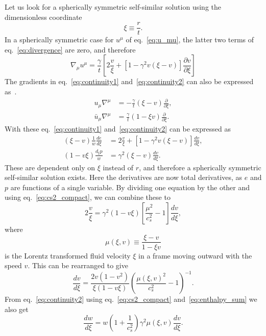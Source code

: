 Let us look for a spherically symmetric self-similar solution using the dimensionless coordinate
\begin{equation}
\xi \equiv \frac{r}{t}.
\label{eq:xi}
\end{equation}
In a spherically symmetric case for $u^\mu$ of eq.~\eqref{eq:u_mu},
the latter two terms of eq.~\eqref{eq:divergence} are zero, and therefore
\begin{equation}
\nabla_\mu u^\mu = \frac{\gamma}{t} \left[ 2\frac{v}{\xi} + \left[1 - \gamma^2 v (\xi - v) \right] \frac{\partial v}{\partial \xi} \right]
\end{equation}
The gradients in eq.~\eqref{eq:continuity1} and~\eqref{eq:continuity2} can also be expressed as~\cite[eq. 25]{espinosa_energy_2010}.
\begin{align}
u_\mu \nabla^\mu &= - \frac{\gamma}{t} (\xi - v) \frac{\partial}{\partial \xi}, \\
\bar{u}_\mu \nabla^\mu &= \frac{\gamma}{t} (1 - \xi v) \frac{\partial}{\partial \xi}.
\end{align}
With these eq.~\eqref{eq:continuity1} and~\eqref{eq:continuity2} can be expressed as
\begin{align}
(\xi - v) \frac{1}{w} \frac{de}{d\xi} &= 2 \frac{v}{\xi} + \left[ 1 - \gamma^2 v (\xi - v) \right] \frac{dv}{d\xi}, \\
(1 - v\xi) \frac{d_\xi p}{w} &= \gamma^2 (\xi - v) \frac{dv}{d\xi}.
\end{align}
These are dependent only on $\xi$ instead of $r$,
and therefore a spherically symmetric self-similar solution exists.
Here the derivatives are now total derivatives, as $e$ and $p$ are functions of a single variable.
By dividing one equation by the other and using eq.~\eqref{eq:cs2_compact}, we can combine these to
\begin{equation}
2 \frac{v}{\xi} = \gamma^2 (1 - v\xi) \left[ \frac{\mu^2}{c_s^2} - 1 \right] \frac{dv}{d\xi},
\label{eq:continuity_combined}
\end{equation}
where
\begin{equation}
\mu(\xi,v) \equiv \frac{\xi - v}{1 - \xi v}
\label{eq:mu}
\end{equation}
is the
Lorentz transformed fluid velocity
$\xi$ in a frame moving outward with the speed $v$.
This can be rearranged to give
\cites[eq. 7.30-7.31]{lecture_notes}[eq. 5]{giese_2021}
\begin{equation}
\frac{dv}{d\xi} = \frac{2v(1-v^2)}{\xi(1-v\xi)} \left( \frac{\mu(\xi,v)^2}{c_s^2} - 1 \right)^{-1}.
\label{eq:hydro_diff1}
\end{equation}
From eq.~\eqref{eq:continuity2} using eq.~\eqref{eq:cs2_compact} and~\eqref{eq:enthalpy_sum} we also get
\begin{equation}
\frac{dw}{d\xi} = w \left( 1 + \frac{1}{c_s^2} \right) \gamma^2 \mu(\xi,v) \frac{dv}{d\xi}.
\label{eq:hydro_diff2}
\end{equation}

